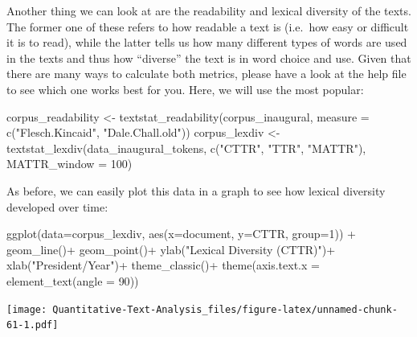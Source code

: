 \documentclass[
]{book}
\newenvironment{Shaded}{\begin{snugshade}}{\end{snugshade}}
\newcommand{\AttributeTok}[1]{\textcolor[rgb]{0.77,0.63,0.00}{#1}}
\newcommand{\DecValTok}[1]{\textcolor[rgb]{0.00,0.00,0.81}{#1}}
\newcommand{\FunctionTok}[1]{\textcolor[rgb]{0.00,0.00,0.00}{#1}}
\newcommand{\NormalTok}[1]{#1}
\newcommand{\OtherTok}[1]{\textcolor[rgb]{0.56,0.35,0.01}{#1}}
\newcommand{\SpecialCharTok}[1]{\textcolor[rgb]{0.00,0.00,0.00}{#1}}
\newcommand{\StringTok}[1]{\textcolor[rgb]{0.31,0.60,0.02}{#1}}
\begin{document}
Another thing we can look at are the readability and lexical diversity of the texts. The former one of these refers to how readable a text is (i.e.~how easy or difficult it is to read), while the latter tells us how many different types of words are used in the texts and thus how ``diverse'' the text is in word choice and use. Given that there are many ways to calculate both metrics, please have a look at the help file to see which one works best for you. Here, we will use the most popular:

\begin{Shaded}
\begin{Highlighting}[]
\NormalTok{corpus\_readability }\OtherTok{\textless{}{-}} \FunctionTok{textstat\_readability}\NormalTok{(corpus\_inaugural, }\AttributeTok{measure =} \FunctionTok{c}\NormalTok{(}\StringTok{"Flesch.Kincaid"}\NormalTok{, }\StringTok{"Dale.Chall.old"}\NormalTok{))}
\NormalTok{corpus\_lexdiv }\OtherTok{\textless{}{-}} \FunctionTok{textstat\_lexdiv}\NormalTok{(data\_inaugural\_tokens, }\FunctionTok{c}\NormalTok{(}\StringTok{"CTTR"}\NormalTok{, }\StringTok{"TTR"}\NormalTok{, }\StringTok{"MATTR"}\NormalTok{), }\AttributeTok{MATTR\_window =} \DecValTok{100}\NormalTok{)}
\end{Highlighting}
\end{Shaded}

As before, we can easily plot this data in a graph to see how lexical diversity developed over time:

\begin{Shaded}
\begin{Highlighting}[]
\FunctionTok{ggplot}\NormalTok{(}\AttributeTok{data=}\NormalTok{corpus\_lexdiv, }\FunctionTok{aes}\NormalTok{(}\AttributeTok{x=}\NormalTok{document, }\AttributeTok{y=}\NormalTok{CTTR, }\AttributeTok{group=}\DecValTok{1}\NormalTok{)) }\SpecialCharTok{+}
  \FunctionTok{geom\_line}\NormalTok{()}\SpecialCharTok{+}
  \FunctionTok{geom\_point}\NormalTok{()}\SpecialCharTok{+}
  \FunctionTok{ylab}\NormalTok{(}\StringTok{"Lexical Diversity (CTTR)"}\NormalTok{)}\SpecialCharTok{+}
  \FunctionTok{xlab}\NormalTok{(}\StringTok{"President/Year"}\NormalTok{)}\SpecialCharTok{+}
  \FunctionTok{theme\_classic}\NormalTok{()}\SpecialCharTok{+}
  \FunctionTok{theme}\NormalTok{(}\AttributeTok{axis.text.x =} \FunctionTok{element\_text}\NormalTok{(}\AttributeTok{angle =} \DecValTok{90}\NormalTok{))}
\end{Highlighting}
\end{Shaded}

\texttt{[image: Quantitative-Text-Analysis\_files/figure-latex/unnamed-chunk-61-1.pdf]}
\end{document}

